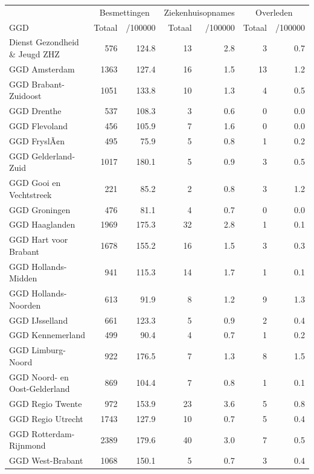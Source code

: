 \documentclass[
  english,
  man,floatsintext]{apa6}
\begin{document}
\begin{table}
\centering\begingroup\fontsize{10}{12}\selectfont

\begin{threeparttable}
\begin{tabular}{lrrrrrr}
\toprule
\multicolumn{1}{c}{ } & \multicolumn{2}{c}{Besmettingen} & \multicolumn{2}{c}{Ziekenhuisopnames} & \multicolumn{2}{c}{Overleden} \\
\cmidrule(l{3pt}r{3pt}){2-3} \cmidrule(l{3pt}r{3pt}){4-5} \cmidrule(l{3pt}r{3pt}){6-7}
GGD & Totaal & /100000 & Totaal & /100000 & Totaal & /100000\\
\midrule
Dienst Gezondheid \& Jeugd ZHZ & 576 & 124.8 & 13 & 2.8 & 3 & 0.7\\
GGD Amsterdam & 1363 & 127.4 & 16 & 1.5 & 13 & 1.2\\
GGD Brabant-Zuidoost & 1051 & 133.8 & 10 & 1.3 & 4 & 0.5\\
GGD Drenthe & 537 & 108.3 & 3 & 0.6 & 0 & 0.0\\
GGD Flevoland & 456 & 105.9 & 7 & 1.6 & 0 & 0.0\\
GGD FryslÃ¢n & 495 & 75.9 & 5 & 0.8 & 1 & 0.2\\
GGD Gelderland-Zuid & 1017 & 180.1 & 5 & 0.9 & 3 & 0.5\\
GGD Gooi en Vechtstreek & 221 & 85.2 & 2 & 0.8 & 3 & 1.2\\
GGD Groningen & 476 & 81.1 & 4 & 0.7 & 0 & 0.0\\
GGD Haaglanden & 1969 & 175.3 & 32 & 2.8 & 1 & 0.1\\
GGD Hart voor Brabant & 1678 & 155.2 & 16 & 1.5 & 3 & 0.3\\
GGD Hollands-Midden & 941 & 115.3 & 14 & 1.7 & 1 & 0.1\\
GGD Hollands-Noorden & 613 & 91.9 & 8 & 1.2 & 9 & 1.3\\
GGD IJsselland & 661 & 123.3 & 5 & 0.9 & 2 & 0.4\\
GGD Kennemerland & 499 & 90.4 & 4 & 0.7 & 1 & 0.2\\
GGD Limburg-Noord & 922 & 176.5 & 7 & 1.3 & 8 & 1.5\\
GGD Noord- en Oost-Gelderland & 869 & 104.4 & 7 & 0.8 & 1 & 0.1\\
GGD Regio Twente & 972 & 153.9 & 23 & 3.6 & 5 & 0.8\\
GGD Regio Utrecht & 1743 & 127.9 & 10 & 0.7 & 5 & 0.4\\
GGD Rotterdam-Rijnmond & 2389 & 179.6 & 40 & 3.0 & 7 & 0.5\\
GGD West-Brabant & 1068 & 150.1 & 5 & 0.7 & 3 & 0.4\\

\end{tabular}
\end{threeparttable}
\end{table}
\end{document}
